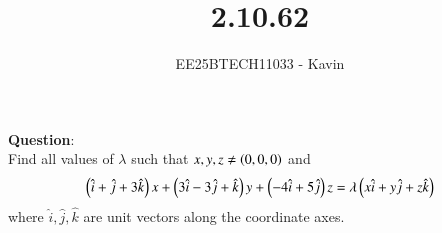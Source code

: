 \documentclass[journal]{IEEEtran}
\begin{document}

\vspace{3cm}

\title{2.10.62}
\author{EE25BTECH11033 - Kavin}
{\let\newpage\relax\maketitle}

\renewcommand{\thefigure}{\theenumi}
\renewcommand{\thetable}{\theenumi}
\setlength{\intextsep}{10pt} %
\textbf{Question}:\\
Find all values of $\lambda$ such that $x,y,z\neq\left(0,0,0\right)$ and $$\left(\hat{i}+\hat{j}+3\hat{k}\right)x+\left(3\hat{i}-3\hat{j}+\hat{k}\right)y+\left(-4\hat{i}+5\hat{j}\right)z=\lambda\left(x\hat{i}+y\hat{j}+z\hat{k}\right)$$ where $\hat{i}, \hat{j}, \hat{k}$ are unit vectors along the coordinate axes.\\
\bigskip
\end{document}
